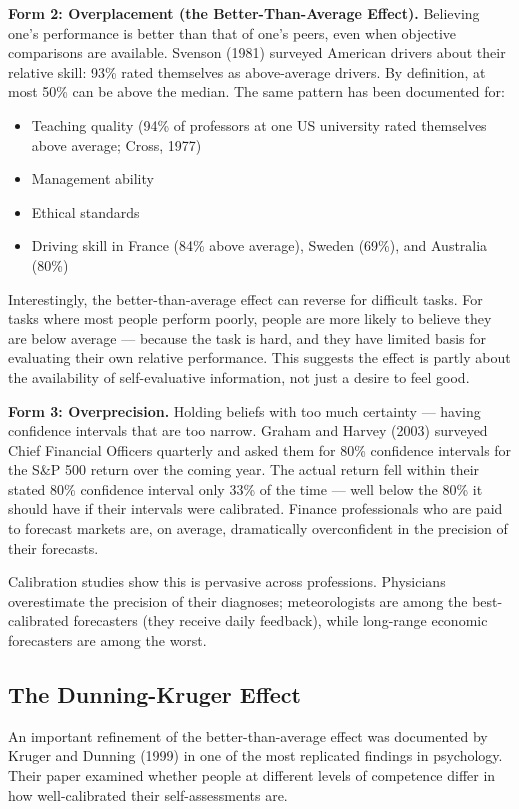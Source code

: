\documentclass[12pt, letterpaper]{article}
\begin{document}
\textbf{Form 2: Overplacement (the Better-Than-Average Effect).} Believing one's performance is better than that of one's peers, even when objective comparisons are available. Svenson (1981) surveyed American drivers about their relative skill: 93\% rated themselves as above-average drivers. By definition, at most 50\% can be above the median. The same pattern has been documented for:
\begin{itemize}
\item Teaching quality (94\% of professors at one US university rated themselves above average; Cross, 1977)
\item Management ability
\item Ethical standards
\item Driving skill in France (84\% above average), Sweden (69\%), and Australia (80\%)
\end{itemize}

Interestingly, the better-than-average effect can reverse for difficult tasks. For tasks where most people perform poorly, people are more likely to believe they are below average --- because the task is hard, and they have limited basis for evaluating their own relative performance. This suggests the effect is partly about the availability of self-evaluative information, not just a desire to feel good.

\textbf{Form 3: Overprecision.} Holding beliefs with too much certainty --- having confidence intervals that are too narrow. Graham and Harvey (2003) surveyed Chief Financial Officers quarterly and asked them for 80\% confidence intervals for the S\&P 500 return over the coming year. The actual return fell within their stated 80\% confidence interval only 33\% of the time --- well below the 80\% it should have if their intervals were calibrated. Finance professionals who are paid to forecast markets are, on average, dramatically overconfident in the precision of their forecasts.

Calibration studies show this is pervasive across professions. Physicians overestimate the precision of their diagnoses; meteorologists are among the best-calibrated forecasters (they receive daily feedback), while long-range economic forecasters are among the worst.


\subsection{The Dunning-Kruger Effect}


An important refinement of the better-than-average effect was documented by Kruger and Dunning (1999) in one of the most replicated findings in psychology. Their paper examined whether people at different levels of competence differ in how well-calibrated their self-assessments are.
\end{document}
